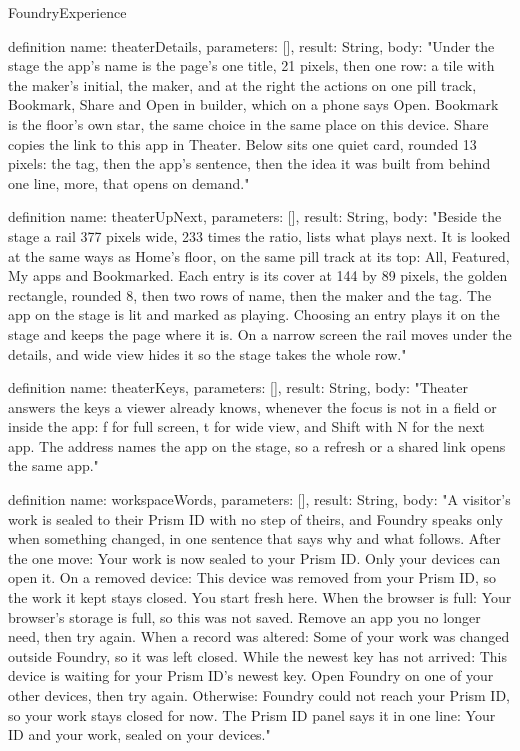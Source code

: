 \begin{lexlean}{FoundryExperience}
\begin{semanticmodule}
definition{
  name: theaterDetails,
  parameters: [],
  result: String,
  body: "Under the stage the app's name is the page's one title, 21 pixels, then one row: a tile with the maker's initial, the maker, and at the right the actions on one pill track, Bookmark, Share and Open in builder, which on a phone says Open. Bookmark is the floor's own star, the same choice in the same place on this device. Share copies the link to this app in Theater. Below sits one quiet card, rounded 13 pixels: the tag, then the app's sentence, then the idea it was built from behind one line, more, that opens on demand."
}

definition{
  name: theaterUpNext,
  parameters: [],
  result: String,
  body: "Beside the stage a rail 377 pixels wide, 233 times the ratio, lists what plays next. It is looked at the same ways as Home's floor, on the same pill track at its top: All, Featured, My apps and Bookmarked. Each entry is its cover at 144 by 89 pixels, the golden rectangle, rounded 8, then two rows of name, then the maker and the tag. The app on the stage is lit and marked as playing. Choosing an entry plays it on the stage and keeps the page where it is. On a narrow screen the rail moves under the details, and wide view hides it so the stage takes the whole row."
}

definition{
  name: theaterKeys,
  parameters: [],
  result: String,
  body: "Theater answers the keys a viewer already knows, whenever the focus is not in a field or inside the app: f for full screen, t for wide view, and Shift with N for the next app. The address names the app on the stage, so a refresh or a shared link opens the same app."
}

definition{
  name: workspaceWords,
  parameters: [],
  result: String,
  body: "A visitor's work is sealed to their Prism ID with no step of theirs, and Foundry speaks only when something changed, in one sentence that says why and what follows. After the one move: Your work is now sealed to your Prism ID. Only your devices can open it. On a removed device: This device was removed from your Prism ID, so the work it kept stays closed. You start fresh here. When the browser is full: Your browser's storage is full, so this was not saved. Remove an app you no longer need, then try again. When a record was altered: Some of your work was changed outside Foundry, so it was left closed. While the newest key has not arrived: This device is waiting for your Prism ID's newest key. Open Foundry on one of your other devices, then try again. Otherwise: Foundry could not reach your Prism ID, so your work stays closed for now. The Prism ID panel says it in one line: Your ID and your work, sealed on your devices."
}


\end{semanticmodule}
\end{lexlean}

